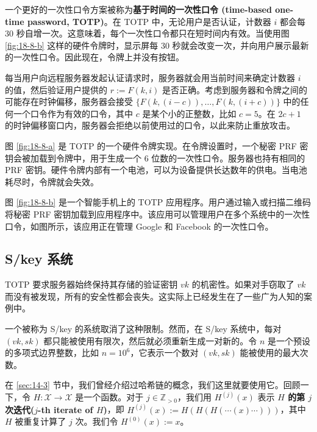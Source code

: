 一个更好的一次性口令方案被称为\textbf{基于时间的一次性口令 (time-based one-time password, TOTP)}。在 TOTP 中，无论用户是否认证，计数器 $i$ 都会每 $30$ 秒自增一次。这意味着，每个一次性口令都只在短时间内有效。当使用图 \ref{fig:18-8-b} 这样的硬件令牌时，显示屏每 $30$ 秒就会改变一次，并向用户展示最新的一次性口令。因此现在，令牌上并没有按钮。

每当用户向远程服务器发起认证请求时，服务器就会用当前时间来确定计数器 $i$ 的值，然后验证用户提供的 $r:=F(k,i)$ 是否正确。考虑到服务器和令牌之间的可能存在时钟偏移，服务器会接受 $\{F(k,(i-c)),\dots,F(k,(i+c))\}$ 中的任何一个口令作为有效的口令，其中 $c$ 是某个小的正整数，比如 $c=5$。在 $2c+1$ 的时钟偏移窗口内，服务器会拒绝以前使用过的口令，以此来防止重放攻击。

图 \ref{fig:18-8-a} 是 TOTP 的一个硬件令牌实现。在令牌设置时，一个秘密 PRF 密钥会被加载到令牌中，用于生成一个 $6$ 位数的一次性口令。服务器也持有相同的 PRF 密钥。硬件令牌内部有一个电池，可以为设备提供长达数年的供电。当电池耗尽时，令牌就会失效。

图 \ref{fig:18-8-b} 是一个智能手机上的 TOTP 应用程序。用户通过输入或扫描二维码将秘密 PRF 密钥加载到应用程序中。该应用可以管理用户在多个系统中的一次性口令，如图所示，该应用正在管理 Google 和 Facebook 的一次性口令。

\subsection{S/key 系统}\label{subsec:18-5-2}

TOTP 要求服务器始终保持其存储的验证密钥 $vk$ 的机密性。如果对手窃取了 $vk$ 而没有被发现，所有的安全性都会丧失。这实际上已经发生在了一些广为人知的案例中。

一个被称为 S/key 的系统取消了这种限制。然而，在 S/key 系统中，每对 $(vk,sk)$ 都只能被使用有限次，然后就必须重新生成一对新的。令 $n$ 是一个预设的多项式边界整数，比如 $n=10^6$，它表示一个数对 $(vk,sk)$ 能被使用的最大次数。

在 \ref{sec:14-3} 节中，我们曾经介绍过哈希链的概念，我们这里就要使用它。回顾一下，令 $H:\mathcal{X}\to\mathcal{X}$ 是一个函数。对于 $j\in\mathbb{Z}_{>0}$，我们用 $H^{(j)}(x)$ 表示 \textbf{$H$ 的第 $j$ 次迭代($j$-th iterate of $H$)}，即 $H^{(j)}(x):=H(H(H(\cdots(x)\cdots)))$，其中 $H$ 被重复计算了 $j$ 次。我们令 $H^{(0)}(x):=x$。

